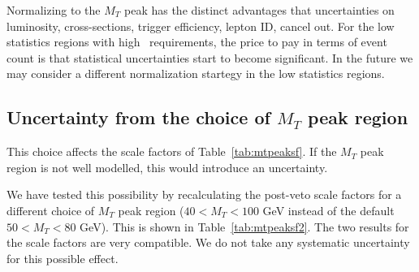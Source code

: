 Normalizing to the $M_T$ peak has the distinct advantages that 
uncertainties on luminosity, cross-sections, trigger efficiency,
lepton ID, cancel out.
For the low statistics regions with high \met\ requirements, the
price to pay in terms of event count is that statistical uncertainties start
to become significant.  In the future we may consider a different
normalization startegy in the low statistics regions.

\subsection{Uncertainty from the choice of $M_T$ peak region}

This choice affects the scale factors of Table~\ref{tab:mtpeaksf}.  
If the $M_T$ peak region is not well modelled, this would introduce an
uncertainty.

We have tested this possibility by recalculating the post-veto scale factors for a different
choice
of $M_T$ peak region ($40 < M_T < 100$ GeV instead of the default
$50 < M_T < 80$ GeV).  This is shown in Table~\ref{tab:mtpeaksf2}.  
The two results for the scale factors are very compatible. 
We do not take any systematic uncertainty for this possible effect.

